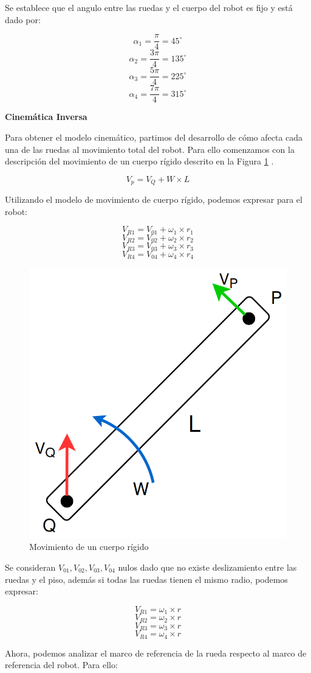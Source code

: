 Se establece que el angulo entre las ruedas y el cuerpo del robot es fijo y está dado por:

$$ \alpha_1 = \frac{\pi}{4} = 45^{\circ} $$
$$ \alpha_2 = \frac{3\pi}{4} = 135^{\circ} $$
$$ \alpha_3 = \frac{5\pi}{4} = 225^{\circ} $$
$$ \alpha_4 = \frac{7\pi}{4} = 315^{\circ} $$

\textbf{Cinemática Inversa} \mbox{} \vspace{8pt}

Para obtener el modelo cinemático, partimos del desarrollo de cómo afecta cada una de las ruedas al movimiento total del robot. Para ello comenzamos con la descripción del movimiento de un cuerpo rígido descrito en la Figura \ref{fig:movimientocuerporigido} \cite{islassistcontrolomni}.

$$ V_p = V_Q + W \times L $$

Utilizando el modelo de movimiento de cuerpo rígido, podemos expresar para el robot:

$$ V_{R1} = V_{01} + \omega_1 \times r_1 $$
$$ V_{R2} = V_{02} + \omega_2 \times r_2 $$
$$ V_{R3} = V_{03} + \omega_3 \times r_3 $$
$$ V_{R4} = V_{04} + \omega_4 \times r_4 $$

\begin{figure}[H]
    \centering
    \includegraphics[width=0.3\linewidth]{images/movimiento_cuerpo_rigido.png}
    \caption{Movimiento de un cuerpo rígido}
    \label{fig:movimientocuerporigido}
\end{figure}

Se consideran $ V_{01}, V_{02}, V_{03}, V_{04} $ nulos dado que no existe deslizamiento entre las ruedas y el piso, además si todas las ruedas tienen el mismo radio, podemos expresar:

$$ V_{R1} = \omega_1 \times r $$
$$ V_{R2} = \omega_2 \times r $$
$$ V_{R3} = \omega_3 \times r $$
$$ V_{R4} = \omega_4 \times r $$

Ahora, podemos analizar el marco de referencia de la rueda respecto al marco de referencia del robot. Para ello:

